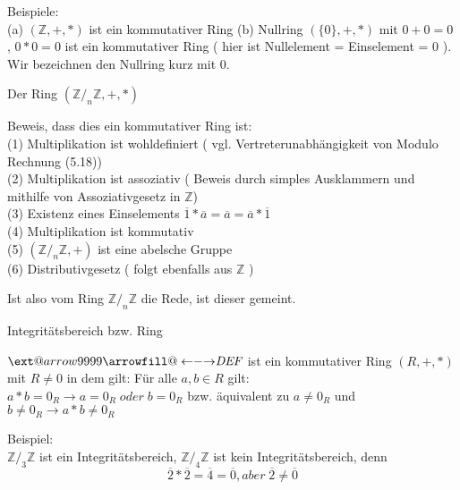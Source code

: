 \documentclass[headsepline,12pt,a4paper]{scrartcl}
\makeatletter
\newcommand\xleftrightarrow[2][]{%
  \ext@arrow 9999{\longleftrightarrowfill@}{#1}{#2}}
\newcommand\longleftrightarrowfill@{%
  \arrowfill@\leftarrow\relbar\rightarrow}
\makeatother
\begin{document}
\item Beispiele: \\
(a) $ (\mathbb{Z},+,*) $ ist ein kommutativer Ring 
(b) Nullring $ ( \{0\}, +, * ) $ mit $0+0 = 0$ ,  $0*0=0$ ist ein kommutativer Ring ( hier ist Nullelement = Einselement = 0 ). Wir bezeichnen den Nullring kurz mit 0.

\begin{center}
\item[ Der Ring $ ( \mathbb{Z}/_n \mathbb{Z} , +, * ) $]
\end{center}
\item Beweis, dass dies ein kommutativer Ring ist:\\
(1) Multiplikation ist wohldefiniert ( vgl. Vertreterunabhängigkeit von Modulo Rechnung (5.18)) \\
(2) Multiplikation ist assoziativ ( Beweis durch simples Ausklammern und mithilfe von Assoziativgesetz in $\mathbb{Z}$) \\
(3) Existenz eines Einselements $ \overline{1} * \overline{a} = \overline{a} =  \overline{a} * \overline{1} $\\
(4) Multiplikation ist kommutativ \\
(5)  $ ( \mathbb{Z}/_n \mathbb{Z} , + ) $ ist eine abelsche Gruppe \\
(6) Distributivgesetz ( folgt ebenfalls aus $\mathbb{Z}$ ) \\
\item Ist also vom Ring $ \mathbb{Z}/_n \mathbb{Z} $ die Rede, ist dieser gemeint.

\begin{center}
\item[ Integritätsbereich bzw. Ring ]
\end{center}
\item $\xleftrightarrow{\textit{DEF}}$ ist ein kommutativer Ring $(R,+,*)$ mit $R\neq 0$ in dem gilt: Für alle $a,b \in R $ gilt: \\
$a*b = 0_R \rightarrow a = 0_R \; \textit{oder} \;   b = 0_R $ bzw. äquivalent zu $ a \neq 0_R $ und $ b \neq 0_R \rightarrow a*b \neq 0_R $ \\
\item Beispiel: \\
$ \mathbb{Z}/_3 \mathbb{Z} $ ist ein Integritätsbereich,  $ \mathbb{Z}/_4 \mathbb{Z} $ ist kein Integritätsbereich, denn \\
$$ \overline{2} * \overline{2} = \overline{4} = \overline{0} , \textit{aber} \; \overline{2} \neq \overline{0} $$ 
\end{document}
